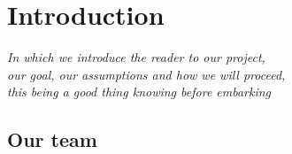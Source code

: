 \chapter{Introduction}\label{ch:intro}

\begin{flushright}{\slshape
    In which we introduce the reader to our project,\\
    our goal, our assumptions and how we will proceed,\\
    this being a good thing knowing before embarking
}
\end{flushright}




\section{Our team}



